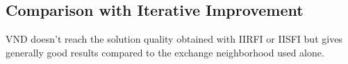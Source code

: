 \subsection{Comparison with Iterative Improvement}


VND doesn't reach the solution quality obtained with IIRFI or IISFI but gives generally good results compared to the exchange neighborhood used alone.